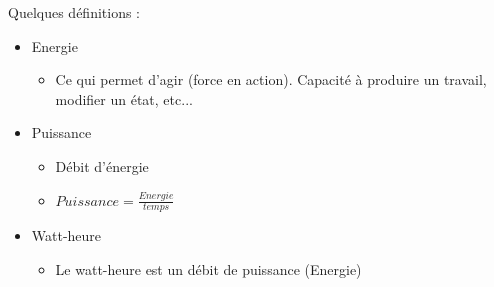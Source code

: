 \documentclass[a4paper]{article}
\begin{document}
Quelques définitions :
\begin{itemize}
    \item Energie
    \begin{itemize}
        \item Ce qui permet d'agir (force en action). Capacité à produire un travail, modifier un état, etc...
    \end{itemize}
    \item Puissance
    \begin{itemize}
        \item Débit d'énergie 
        \item $Puissance = \frac{Energie}{temps}$
    \end{itemize}
    \item Watt-heure
    \begin{itemize}
        \item Le watt-heure est un débit de puissance (Energie)
    \end{itemize}
\end{itemize}
\end{document}
